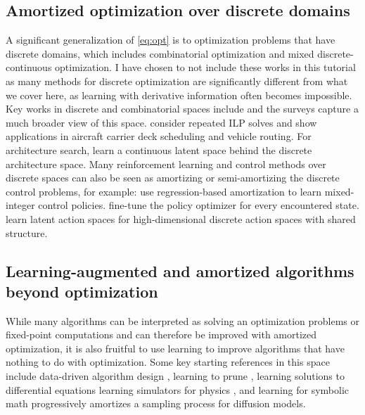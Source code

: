 \documentclass[twoside,11pt]{article}
\begin{document}
\subsection{Amortized optimization over discrete domains}
A significant generalization of \cref{eq:opt} is to optimization
problems that have discrete domains,
which includes combinatorial optimization
and mixed discrete-continuous optimization.
I have chosen to not include these works in this tutorial
as many methods for discrete optimization are significantly
different from what we cover here, as learning with
derivative information often becomes impossible.
Key works in discrete and combinatorial spaces include
\citet{khalil2016learning,dai2017learning,jeong2019learning,bertsimas2019online,shao2021learning,bertsimas2021voice,cappart2021combinatorial}
and the surveys
\citep{lodi2017learning,bengio2021machine,kotary2021end}
capture a much broader view of this space.
\citet{banerjee2015efficiently} consider repeated ILP solves
and show applications in aircraft carrier deck scheduling and vehicle routing.
For architecture search, \citet{luo2018neural} learn a continuous
latent space behind the discrete architecture space.
Many reinforcement learning and control methods over discrete
spaces can also be seen as amortizing or semi-amortizing the
discrete control problems, for example:
\citet{cauligi2020learning,cauligi2021coco} use regression-based
amortization to learn mixed-integer control policies.
\citet{fickinger2021scalable} fine-tune the policy
optimizer for every encountered state.
\citet{tennenholtz2019natural,chandak2019learning,van2020q}
learn latent action spaces for high-dimensional
discrete action spaces with shared structure.

\subsection{Learning-augmented and amortized algorithms beyond optimization}
While many algorithms can be interpreted as solving an
optimization problems or fixed-point computations and
can therefore be improved with amortized optimization,
it is also fruitful to use learning to improve
algorithms that have nothing to do with optimization.
Some key starting references in this space include
data-driven algorithm design \citep{balcan2020data},
learning to prune \citep{alabi2019learning},
learning solutions to differential equations
\citep{li2020fourier,poli2020hypersolvers,karniadakis2021physics,kovachki2021universal,chen2021solving,blechschmidt2021three,marwah2021parametric,berto2021neural}
learning simulators for physics \citep{grzeszczuk1998neuroanimator,ladicky2015data,he2019learning,sanchez2020learning,wiewel2019latent,usman2021machine,vinuesa2021potential},
and learning for symbolic math
\citep{lample2019deep,charton2021linear,charton2021deep,drori2021neural,dascoli2022deep}
\citet{salimans2022progressive} progressively amortizes a
sampling process for diffusion models.
\end{document}
